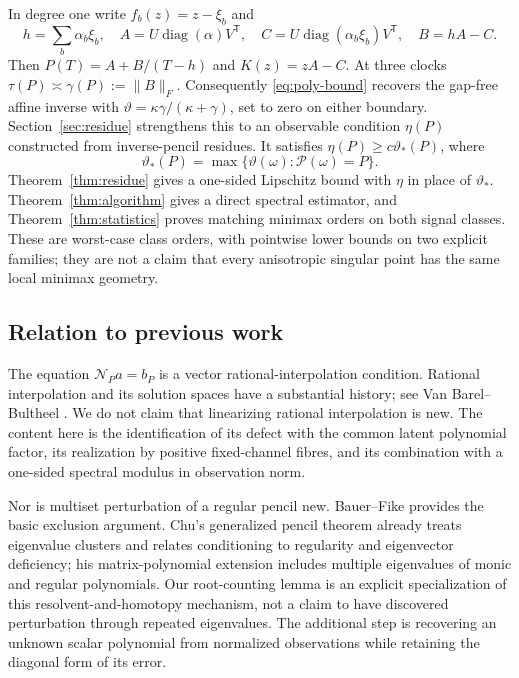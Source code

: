 \documentclass[11pt,reqno]{amsart}
\numberwithin{equation}{section}
\theoremstyle{definition}\newtheorem{definition}[theorem]{Definition}
\theoremstyle{remark}\newtheorem{remark}[theorem]{Remark}
\newcommand{\diag}{\operatorname{diag}}
\newcommand{\cN}{\mathcal N}
\newcommand{\sig}{\vartheta}
\begin{document}
In degree one write $f_b(z)=z-\xi_b$ and
\begin{equation}\label{eq:affine}
 h=\sum_b\alpha_b\xi_b,\quad
 A=U\diag(\alpha)V^{\mathsf T},\quad
 C=U\diag(\alpha_b\xi_b)V^{\mathsf T},\quad
 B=hA-C.
\end{equation}
Then $P(T)=A+B/(T-h)$ and $K(z)=zA-C$. At three clocks
$\tau(P)\asymp\gamma(P):=\|B\|_F$. Consequently
\eqref{eq:poly-bound} recovers the gap-free affine inverse with
$\sig=\kappa\gamma/(\kappa+\gamma)$, set to zero on either boundary.
Section~\ref{sec:residue} strengthens this to an observable condition
$\eta(P)$ constructed from inverse-pencil residues. It satisfies
$\eta(P)\ge c\sig_*(P)$, where
\begin{equation}\label{eq:envelope}
 \sig_*(P)=\max\{\sig(\omega):\mathcal P(\omega)=P\}.
\end{equation}
Theorem~\ref{thm:residue} gives a one-sided Lipschitz bound with
$\eta$ in place of $\sig_*$. Theorem~\ref{thm:algorithm} gives a
direct spectral estimator, and Theorem~\ref{thm:statistics} proves
matching minimax orders on both signal classes. These are worst-case
class orders, with pointwise lower bounds on two explicit families;
they are not a claim that every anisotropic singular point has the
same local minimax geometry.

\subsection{Relation to previous work}
The equation $\cN_Pa=b_P$ is a vector rational-interpolation condition.
Rational interpolation and its solution spaces have a substantial
history; see Van Barel--Bultheel \cite{VBB}. We do not claim that
linearizing rational interpolation is new. The content here is the
identification of its defect with the common latent polynomial factor,
its realization by positive fixed-channel fibres, and its combination
with a one-sided spectral modulus in observation norm.

Nor is multiset perturbation of a regular pencil new. Bauer--Fike
\cite{BF} provides the basic exclusion argument. Chu's generalized
pencil theorem \cite{Chu87} already treats eigenvalue clusters and
relates conditioning to regularity and eigenvector deficiency; his
matrix-polynomial extension \cite{Chu03} includes multiple eigenvalues
of monic and regular polynomials. Our root-counting lemma is an
explicit specialization of this resolvent-and-homotopy mechanism, not
a claim to have discovered perturbation through repeated eigenvalues.
The additional step is recovering an unknown scalar polynomial from
normalized observations while retaining the diagonal form of its error.
\end{document}
